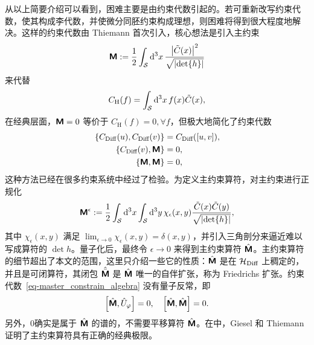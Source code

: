 		从以上简要介绍可以看到，困难主要是由约束代数引起的。若可重新改写约束代数，使其构成李代数，并使微分同胚约束构成理想，则困难将得到很大程度地解决。这样的约束代数由 Thiemann 首次引入\cite{Thiemann2003zv}，核心想法是引入主约束
		\begin{equation}
			\bm{\mathsf{M}} := \frac{1}{2} \int_{\mathcal{S}} \dd[3]{x} \frac{\abs{\tilde{C}(x)}^2}{\sqrt{\abs{\det{h}}}}
		\end{equation}
		来代替
		\begin{equation}
			C_{\text{H}}(f) = \int_{\mathcal{S}} \dd[3]{x} f(x) \tilde{C}(x),
		\end{equation}
		在经典层面，$\bm{\mathsf{M}} = 0$ 等价于 $C_{\text{H}}(f) = 0, \forall f$，但极大地简化了约束代数
		\begin{equation}
			\begin{split}
				\left\{ C_{\mathrm{Diff}}(u), C_{\text{Diff}}(v) \right\} &= C_{\text{Diff}}([u,v]),\\
				\left\{ C_{\text{Diff}}(v), \bm{\mathsf{M}} \right\} &= 0,\\
				\left\{ \bm{\mathsf{M}}, \bm{\mathsf{M}} \right\} &= 0,\label{eq-master_constrain_algebra}
			\end{split}
		\end{equation}
		这种方法已经在很多约束系统中经过了检验\cite{Dittrich:2004bn,Dittrich:2004bp,Dittrich:2004bq,Dittrich:2004br,Dittrich:2004bs}。为定义主约束算符，对主约束进行正规化
		\begin{equation}
			\bm{\mathsf{M}}^\epsilon := \frac{1}{2} \int_{\mathcal{S}} \dd[3]{x} \int_{\mathcal{S}} \dd[3]{y} \chi_\epsilon(x,y) \frac{\tilde{C}(x) \tilde{C}(y)}{\sqrt{\abs{\det{h}}}},
		\end{equation}
		其中 $\chi_\epsilon(x,y)$ 满足 $\lim_{\epsilon \rightarrow 0} \chi_\epsilon(x,y) = \delta(x,y)$，并引入三角剖分来逼近难以写成算符的 $\det{h}$。量子化后，最终令 $\epsilon \rightarrow 0$ 来得到主约束算符 $\hat{\bm{\mathsf{M}}}$。主约束算符的细节超出了本文的范围，这里只介绍一些它的性质：$\hat{\bm{\mathsf{M}}}$ 是在 $\mathcal{H}_{\text{Diff}}$ 上稠定的，并且是可闭算符，其闭包 $\hat{\bar{\bm{\mathsf{M}}}}$ 是 $\hat{\bm{\mathsf{M}}}$ 唯一的自伴扩张，称为 Friedrichs 扩张。约束代数~\eqref{eq-master_constrain_algebra} 没有量子反常，即
		\begin{equation}
			\left[ \hat{\masterconstraint{M}}, \hat{U}_{\varphi} \right] = 0 \qc \left[ \hat{\masterconstraint{M}}, \hat{\masterconstraint{M}} \right] = 0.
		\end{equation}
		另外，0确实是属于 $\hat{\bm{\mathsf{M}}}$ 的谱的，不需要平移算符 $\hat{\bm{\mathsf{M}}}$\cite{Thiemann:2005zg}。在\cite{Giesel:2006uj,Giesel:2006uk}中，Giesel 和 Thiemann 证明了主约束算符具有正确的经典极限。

